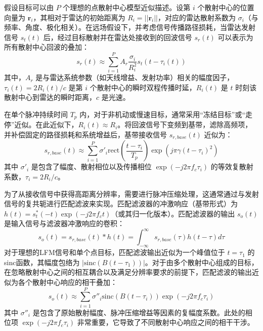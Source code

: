 假设目标可以由 $P$ 个理想的点散射中心模型近似描述。设第 $i$ 个散射中心的位置向量为 $\mathbf{r}_i$，其相对于雷达的初始距离为 $R_i = ||\mathbf{r}_i||$，对应的雷达散射系数为 $\sigma_i$（与频率、角度、极化相关）。在远场假设下，并考虑信号传播路径损耗，当雷达发射信号 $s_t(t)$ 后，经过目标散射并在雷达处接收到的回波信号 $s_r(t)$ 可以表示为所有散射中心回波的叠加：
\begin{equation}
    s_r(t) \approx \sum_{i=1}^{P} A_r \frac{\sigma_i}{R_i^2} s_t\left(t - \tau_i(t)\right)
    \label{eq:received_signal_sum_amplitude}
\end{equation}
其中，$A_r$ 是与雷达系统参数（如天线增益、发射功率）相关的幅度因子，$\tau_i(t) = 2 R_i(t) / c$ 是第 $i$ 个散射中心的瞬时双程传播时延，$R_i(t)$ 是 $t$ 时刻该散射中心到雷达的瞬时距离，$c$ 是光速。

在单个脉冲持续时间 $T_p$ 内，对于非机动或慢速目标，通常采用“冻结目标”或“走停”近似。在此近似下，$R_i(t) \approx R_i$。将回波信号下变频到基带，滤除高频项，并补偿固定的路径损耗和系统增益后，基带接收信号 $s_{r,base}(t)$ 近似为：
\begin{equation}
    s_{r,base}(t) \approx \sum_{i=1}^{P} \sigma'_i \text{rect}\left(\frac{t-\tau_i}{T_p}\right) \exp\left(j \pi \gamma (t-\tau_i)^2\right)
    \label{eq:received_baseband}
\end{equation}
其中 $\sigma'_i$ 是包含了幅度、散射相位以及传播相位 $\exp(-j 2\pi f_c \tau_i)$ 的等效复散射系数，$\tau_i = 2R_i/c$。

为了从接收信号中获得高距离分辨率，需要进行脉冲压缩处理，这通常通过与发射信号的复共轭进行匹配滤波来实现。匹配滤波器的冲激响应（基带形式）为 $h(t) = s_t^*(-t) \exp(-j 2\pi f_c t)$（或其归一化版本）。匹配滤波器的输出 $s_o(t)$ 是输入信号与滤波器冲激响应的卷积：
\begin{equation}
    s_o(t) = s_{r,base}(t) * h(t) = \int_{-\infty}^{\infty} s_{r,base}(\tau) h(t-\tau) d\tau
    \label{eq:matched_filtering}
\end{equation}
对于理想的LFM信号和单个点目标，匹配滤波输出近似为一个峰值位于 $t = \tau_1$ 的sinc函数，其幅度包络为 $|\text{sinc}(B(t - \tau_1))|$。对于由多个散射中心组成的目标，在忽略散射中心之间的相互耦合以及满足分辨率要求的前提下，匹配滤波的输出近似为各个散射中心响应的相干叠加：
\begin{equation}
    s_o(t) \approx \sum_{i=1}^{P} \sigma''_i \text{sinc}\left(B(t - \tau_i)\right) \exp(-j 2\pi f_c \tau_i)
    \label{eq:pulse_compression_output_phase}
\end{equation}
其中 $\sigma''_i$ 是包含了原始散射幅度、脉冲压缩增益等因素的复幅度系数。此处的相位项 $\exp(-j 2\pi f_c \tau_i)$ 非常重要，它导致了不同散射中心响应之间的相干干涉。

